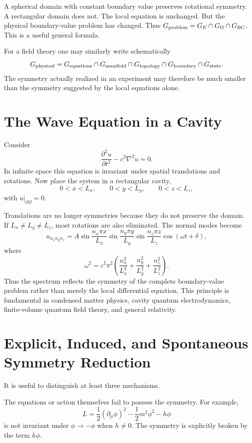 A spherical domain with constant boundary value preserves rotational symmetry.
A rectangular domain does not.
The local equation is unchanged.
But the physical boundary-value problem has changed.
Thus $G_{\rm problem}=G_E\cap G_\Omega\cap G_{\rm BC}$.
This is a useful general formula.

For a field theory one may similarly write schematically
\[
G_{\rm physical}=
G_{\rm equations}
\cap
G_{\rm manifold}
\cap
G_{\rm topology}
\cap
G_{\rm boundary}
\cap
G_{\rm state}.
\]
The symmetry actually realized in an experiment may therefore be much smaller
than the symmetry suggested by the local equations alone.

\section{ The Wave Equation in a Cavity}
\label{sp:we}

Consider
\[\frac{\partial^2 u}{\partial t^2}-c^2\nabla^2u=0.\]
In infinite space this equation is invariant under spatial translations and 
rotations.
Now place the system in a rectangular cavity,
\[0<x<L_x,\qquad 0<y<L_y,\qquad 0<z<L_z,\]
with $u|_{\partial\Omega}=0$.

Translations are no longer symmetries because they do not preserve the domain.
If $L_x\neq L_y\neq L_z$, most rotations are also eliminated.
The normal modes become
\[u_{n_xn_yn_z}=A\sin\frac{n_x\pi x}{L_x}\sin\frac{n_y\pi y}{L_y}
\sin\frac{n_z\pi z}{L_z}\cos(\omega t+\delta),\]
where
\[\omega^2=c^2\pi^2\left(\frac{n_x^2}{L_x^2}+\frac{n_y^2}{L_y^2}
+\frac{n_z^2}{L_z^2}\right).\]
Thus the spectrum reflects the symmetry of the complete boundary-value problem rather than merely the local differential equation.
This principle is fundamental in condensed matter physics, cavity quantum electrodynamics, finite-volume quantum field theory, and general relativity.

\section{Explicit, Induced, and Spontaneous Symmetry Reduction}
\label{sp:sr}

It is useful to distinguish at least three mechanisms.

The equations or action themselves fail to possess the symmetry.
For example,
\[L= \frac{1}{2}(\partial_\mu\phi)^2-\frac{1}{2}m^2\phi^2-h\phi\]
is not invariant under $\phi\rightarrow-\phi$ when $h\neq0$.
The symmetry is explicitly broken by the term $h\phi$.


